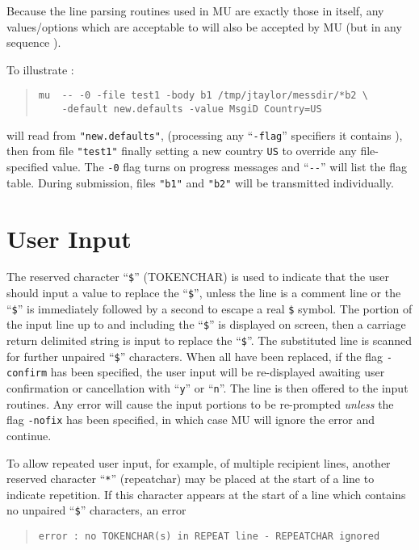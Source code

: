 Because the line parsing routines used in MU are exactly those
in  itself, any values/options which are acceptable to
 will also be accepted by MU (but in any
sequence ).

To illustrate :
\begin{quote}\small\begin{verbatim}
mu  -- -0 -file test1 -body b1 /tmp/jtaylor/messdir/*b2 \
    -default new.defaults -value MsgiD Country=US
\end{verbatim}\end{quote}

will read from \verb+"new.defaults"+, (processing any ``\verb+-flag+''
specifiers it contains ), then from file \verb+"test1"+ finally
setting a new country \verb+US+ to override any file-specified value.
The \verb+-0+ flag turns on progress messages and ``\verb+--+'' will list
the flag table.  During submission, files \verb+"b1"+ and \verb+"b2"+
will be transmitted individually.

\section{User Input}

The reserved character ``\verb+$+'' (TOKENCHAR) is used to indicate that
the user should input a value to replace the ``\verb+$+'', unless the
line is a comment line or the ``\verb+$+'' is immediately followed by a
second to escape a real \verb+$+ symbol.  The portion of the input
line up to and including the ``\verb+$+'' is displayed on screen, then a
carriage return delimited string is input to replace the ``\verb+$+''.
The substituted line is scanned for further unpaired ``\verb+$+''
characters.  When all have been replaced, if the flag \verb+-confirm+
has been specified, the user input will be re-displayed awaiting user
confirmation or cancellation with ``\verb+y+'' or ``\verb+n+''.  The line
is then offered to the \pgm{submit} input routines.  Any error will
cause the input portions to be re-prompted {\em unless\/} the flag
\verb+-nofix+ has been specified, in which case MU will ignore
the error and continue.

To allow repeated user input, for example, of multiple recipient
lines, another reserved character ``\verb+*+'' (repeatchar) may be
placed at the start of a line to indicate repetition.  If this
character appears at the start of a line which contains no unpaired
``\verb+$+'' characters, an error

\begin{quote}\small\begin{verbatim}
error : no TOKENCHAR(s) in REPEAT line - REPEATCHAR ignored
\end{verbatim}\end{quote}

